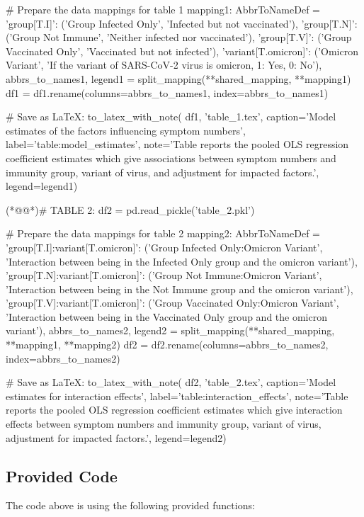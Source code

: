 \documentclass[11pt]{article}
\begin{document}
\begin{python}
# Prepare the data mappings for table 1 
mapping1: AbbrToNameDef = {
    'group[T.I]': ('Group Infected Only', 'Infected but not vaccinated'),
    'group[T.N]': ('Group Not Immune', 'Neither infected nor vaccinated'), 
    'group[T.V]': ('Group Vaccinated Only', 'Vaccinated but not infected'), 
    'variant[T.omicron]': ('Omicron Variant', 'If the variant of SARS-CoV-2 virus is omicron, 1: Yes, 0: No'), 
} 
abbrs_to_names1, legend1 = split_mapping({**shared_mapping, **mapping1}) 
df1 = df1.rename(columns=abbrs_to_names1, index=abbrs_to_names1) 

# Save as LaTeX: 
to_latex_with_note( 
    df1, 'table_1.tex', 
    caption='Model estimates of the factors influencing symptom numbers', 
    label='table:model_estimates', 
    note='Table reports the pooled OLS regression coefficient estimates which give associations between symptom numbers and immunity group, variant of virus, and adjustment for impacted factors.', 
    legend=legend1) 

(*@@*)# TABLE 2: 
df2 = pd.read_pickle('table_2.pkl') 

# Prepare the data mappings for table 2 
mapping2: AbbrToNameDef = { 
    'group[T.I]:variant[T.omicron]': ('Group Infected Only:Omicron Variant', 'Interaction between being in the Infected Only group and the omicron variant'),
    'group[T.N]:variant[T.omicron]': ('Group Not Immune:Omicron Variant', 'Interaction between being in the Not Immune group and the omicron variant'),
    'group[T.V]:variant[T.omicron]': ('Group Vaccinated Only:Omicron Variant', 'Interaction between being in the Vaccinated Only group and the omicron variant'),
} 
abbrs_to_names2, legend2 = split_mapping({**shared_mapping, **mapping1, **mapping2}) 
df2 = df2.rename(columns=abbrs_to_names2, index=abbrs_to_names2) 

# Save as LaTeX: 
to_latex_with_note( 
    df2, 'table_2.tex', 
    caption='Model estimates for interaction effects', 
    label='table:interaction_effects', 
    note='Table reports the pooled OLS regression coefficient estimates which give interaction effects between symptom numbers and immunity group, variant of virus, adjustment for impacted factors.', 
    legend=legend2) 

\end{python}

\subsection{Provided Code}
The code above is using the following provided functions:
\end{document}
